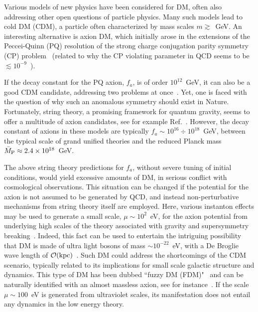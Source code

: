 \documentclass[twocolumn,preprintnumbers,
endnote,prl]{revtex4-1}
\newcommand{\lsim}{\lesssim}
\newcommand{\gsim}{\gtrsim}
\newcommand{\ord}[1]{\mathcal{O}{(#1)}}
\newcommand{\rmP}{\bar{M}_{\rm P}}
\begin{document}
Various models of new physics have been considered for DM, often also 
addressing other open questions of particle physics.  Many such models lead to cold DM (CDM), a particle often characterized by 
mass scales $m\gsim$~GeV.  An interesting alternative is axion DM, which initially arose in the 
extensions of the Peccei-Quinn (PQ) resolution of the strong charge conjugation parity symmetry (CP) 
problem~\cite{Peccei:1977hh, Wilczek:1977pj, Weinberg:1977ma} (related to why the CP violating parameter in QCD seems to be  $\lsim 10^{-9}$~\cite{Olive:2016xmw}).  

If the decay constant for the PQ axion, $f_a$, is of order $10^{12}$~GeV, it can also 
be a good CDM candidate, addressing two problems at once~\cite{Preskill:1982cy, Abbott:1982af, Dine:1982ah}.  Yet, one is faced with the 
question of why such an anomalous symmetry should exist in Nature.  Fortunately, string theory, a promising 
framework for quantum gravity, seems to offer a multitude of axion candidates, see for example Ref.~\cite{Svrcek:2006yi}.  However, 
the decay constant of axions in these models are typically $f_a \sim 10^{16} \div 10^{18}$~GeV, between the typical scale 
of grand unified theories and the reduced Planck mass $\rmP \approx 2.4 \times 10^{18}$~GeV.  

The above string theory predictions for $f_a$, without 
severe tuning of initial conditions, would yield excessive amounts of DM, in serious conflict with cosmological observations.  This 
situation can be changed if the potential for the axion is not assumed to be generated by QCD, and instead non-perturbative mechanisms from string theory itself are employed.  Here, various instanton effects may be used to generate a small 
scale, $\mu \sim 10^2$~eV, for the axion potential from underlying high scales of the theory associated with gravity and supersymmetry breaking~\cite{Svrcek:2006yi}.  Indeed, this fact can be used to entertain the intriguing possibility that DM is made of ultra light bosons of mass $\sim 10^{-22}$~eV, with a De Broglie wave length of $\ord{\rm kpc}$~\cite{Hui:2016ltb}. Such DM could address the shortcomings of the CDM scenario, 
typically related to its implications for small scale galactic structure and dynamics.  This type of DM has been dubbed ``fuzzy DM (FDM)"~\cite{Hu:2000ke} and can be naturally identified with an almost massless axion, see for instance~\cite{Press:1989id, Sin:1992bg, Peebles:2000yy, Goodman:2000tg, Amendola:2005ad, Viel:2013apy, Schive:2014dra, Hlozek:2014lca, Kim:2015yna, Marsh:2015xka}.  If the scale $\mu\sim 100$~eV is generated from ultraviolet scales, its manifestation does not 
entail any dynamics in the low energy theory.  
\end{document}
